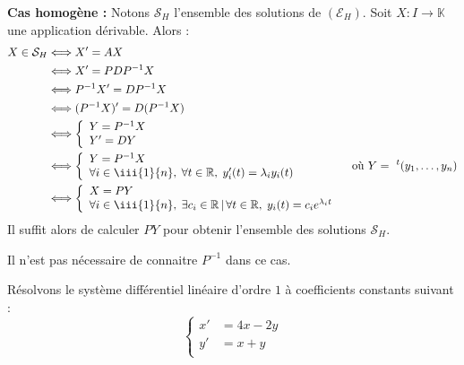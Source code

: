 \documentclass[french,11pt,twoside]{VcCours}
\begin{document}
\textbf{Cas homogène :} Notons $\mathcal{S}_H$ l'ensemble des solutions de $(\mathcal{E}_H)$. Soit $X : I \rightarrow \mathbb{K}$ une application dérivable. Alors :
\begin{align*}
X \in \mathcal{S}_H & \Longleftrightarrow  X'=AX \\
& \Longleftrightarrow X'=PDP^{-1} X\\
& \Longleftrightarrow P^{-1}X'=DP^{-1}X \\
& \Longleftrightarrow (P^{-1}X)'=D(P^{-1}X) \\
& \Longleftrightarrow \left\lbrace \begin{array}{l}
Y=P^{-1}X \\
Y'=DY \\
\end{array}\right. \\
& \Longleftrightarrow \left\lbrace \begin{array}{l}
Y=P^{-1}X \\
\forall i \in \iii{1}{n}, \; \forall t \in  \mathbb{R},  \; y_i'(t)=\lambda_i y_i(t)  \\
\end{array}\right. \qquad \qquad \hbox{ où } Y= ~^t(y_1, \ldots, y_n) \\
& \Longleftrightarrow \left\lbrace \begin{array}{l}
X=PY \\
\forall i \in \iii{1}{n}, \; \exists c_i \in  \mathbb{R} \, \vert \, \forall t \in \mathbb{R}, \; y_i(t)=c_i e^{\lambda_i t}  \\
\end{array}\right.
\end{align*}
Il suffit alors de calculer $PY$ pour obtenir l'ensemble des solutions $\mathcal{S}_H$.

\begin{Remarque}{} Il n'est pas nécessaire de connaitre $P^{-1}$ dans ce cas.
\end{Remarque}

\begin{Exemple} Résolvons le système différentiel linéaire d'ordre $1$ à coefficients constants suivant : 
$$ \left\lbrace \begin{array}{lll}
    x' & = 4x - 2y \\
    y' & = x + y \\
    \end{array}\right.$$
    
    \vspace{12cm}
\end{Exemple}
\end{document}
